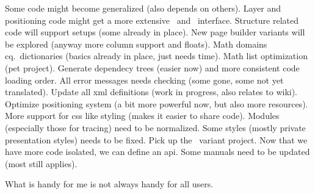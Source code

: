        \startitem Some code might become generalized (also depends on others). \stopitem \FlushStep
        \startitem Layer and positioning code might get a more extensive \LUA\ and \XML\ interface. \stopitem \FlushStep
        \startitem Structure related code will support setups (some already in place). \stopitem \FlushStep
        \startitem New page builder variants will be explored (anyway more column support and floats). \stopitem \FlushStep
        \startitem Math domains cq.\ dictionaries (basics already in place, just needs time). \stopitem \FlushStep
        \startitem Math list optimization (pet project). \stopitem \FlushStep
        \startitem Generate dependecy trees (easier now) and more consistent code loading order. \stopitem \FlushStep
        \startitem All error messages needs checking (some gone, some not yet translated). \stopitem \FlushStep
        \startitem Update all xml definitions (work in progress, also relates to wiki). \stopitem \FlushStep
        \startitem Optimize positioning system (a bit more powerful now, but also more resources). \stopitem \FlushStep
        \startitem More support for css like styling (makes it easier to share code). \stopitem \FlushStep
        \startitem Modules (especially those for tracing) need to be normalized. \stopitem \FlushStep
        \startitem Some styles (mostly private presentation styles) needs to be fixed. \stopitem \FlushStep
        \startitem Pick up the  \CONTEXT\ variant project. \stopitem \FlushStep
        \startitem Now that we have more code isolated, we can define an api. \stopitem \FlushStep
        \startitem Some manuals need to be updated (most still applies). \stopitem \FlushStep

    \stopitemize

\stopsubject

\StopSteps

\page

\StartSteps

\startsubject[title=What I have to keep in mind]

    \startitemize[packed]

        \startitem What is handy for me is not always handy for all users. \stopitem \FlushStep

    \stopitemize

\stopsubject

\startsubject[title=But nevertheless there will be new things]

    \startitemize[packed]


